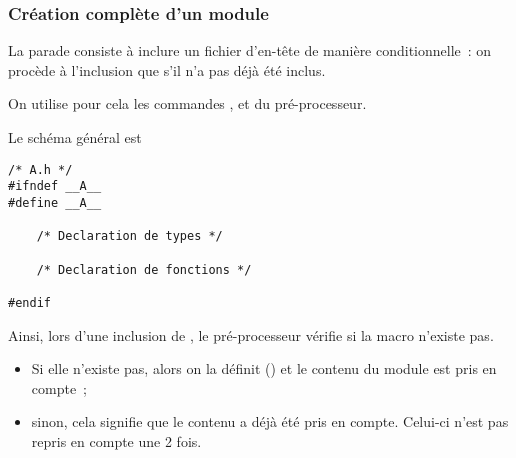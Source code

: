 \begin{frame}[fragile]
\frametitle{Création complète d'un module}
La parade consiste à \alert{inclure} un fichier d'en-tête de
\alert{manière conditionnelle}~: on procède à l'inclusion que s'il n'a
pas déjà été inclus.
\medskip

On utilise pour cela les commandes ,  et
 du pré-processeur.
\medskip

Le schéma général est
\medskip

\begin{minipage}[c]{.49\textwidth}
\begin{lstlisting}[frame=single,numbers=none]
/* A.h */
#ifndef __A__
#define __A__

    /* Declaration de types */

    /* Declaration de fonctions */

#endif
\end{lstlisting}
\end{minipage}\quad
\begin{minipage}[c]{.45\textwidth}
    Ainsi, lors d'une inclusion de , le pré-processeur
    vérifie si la macro  n'existe pas.
    \begin{itemize}
        \item Si elle n'existe pas, alors on la définit
        () et le contenu du module est pris
        en compte~;
        \item sinon, cela signifie que le contenu a déjà été pris en
        compte. Celui-ci n'est pas repris en compte une 2\ieme{} fois.
    \end{itemize}
\end{minipage}
\end{frame}

